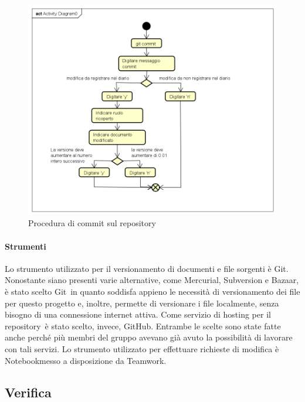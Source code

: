 \documentclass[../NormeProgetto.text]{subfiles}
\begin{document}
				\begin{figure}[H]
					\centering
					\includegraphics[scale=0.5, width=\textwidth]{sections/img/proceduraCommit.png}
					\caption{Procedura di commit sul repository}\label{fig:Procedura di commit sul repository} 
				\end{figure}
				
		\paragraph{Strumenti}
			Lo strumento utilizzato per il versionamento di documenti e file sorgenti è Git\g. Nonostante siano presenti varie alternative, come Mercurial, Subversion e Bazaar, è stato scelto Git\g\ in quanto soddisfa appieno le necessità di versionamento dei file per questo progetto e, inoltre, permette di versionare i file localmente, senza bisogno di una connessione internet attiva. Come servizio di hosting per il repository\g\ è stato scelto, invece, GitHub\g. Entrambe le scelte sono state fatte anche perché più membri del gruppo avevano già avuto la possibilità di lavorare con tali servizi. Lo strumento utilizzato per effettuare richieste di modifica è Notebook\g messo a disposizione da Teamwork\g.
	
	
\subsection{Verifica}
\end{document}
